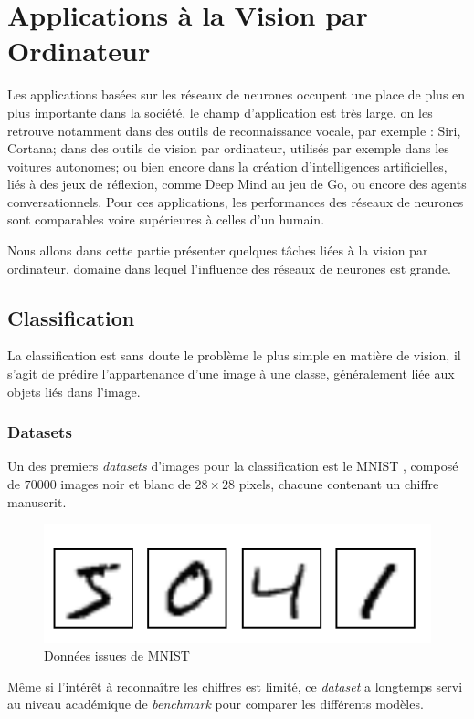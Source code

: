 \documentclass[a4paper, 11pt]{report}
\begin{document}
\section{Applications à la Vision par Ordinateur}
Les applications basées sur les réseaux de neurones occupent une place de plus en plus importante dans la société, le champ d'application est très large, on les retrouve notamment dans des outils de reconnaissance vocale, par exemple : Siri, Cortana; dans des outils de vision par ordinateur, utilisés par exemple dans les voitures autonomes; ou bien encore dans la création d'intelligences artificielles, liés à des jeux de réflexion, comme Deep Mind au jeu de Go, ou encore des agents conversationnels.
Pour ces applications, les performances des réseaux de neurones sont comparables voire supérieures à celles d'un humain.

Nous allons dans cette partie présenter quelques tâches liées à la vision par ordinateur, domaine dans lequel l'influence des réseaux de neurones est grande.
\subsection{Classification}
La classification est sans doute le problème le plus simple en matière de vision, il s'agit de prédire l'appartenance d'une image à une classe, généralement liée aux objets liés dans l'image.
\subsubsection{Datasets}
Un des premiers \emph{datasets} d'images pour la classification est le MNIST \citep{LeCun2010}, composé de $70000$ images noir et blanc de $28 \times 28$ pixels, chacune contenant un chiffre manuscrit.
\begin{figure}[H]
	\centering
	\includegraphics[scale=0.3]{Images/MNIST_Digits.png}
	\caption{Données issues de MNIST}
\end{figure}
Même si l'intérêt à reconnaître les chiffres est limité, ce \emph{dataset} a longtemps servi au niveau académique de \emph{benchmark} pour comparer les différents modèles.
\end{document}
